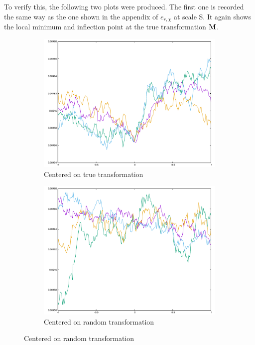 To verify this, the following two plots were produced. The first one is recorded the same way as the one shown in the appendix of $e_{r,\chi}$ at scale S. It again shows the local minimum and inflection point at the true transformation $\mathbf{M}$.

\begin{figure}[H]
\begin{subfigure}{.49\textwidth}
	\includegraphics[width=\linewidth]{fig/ajherr/t3rr/c1.pdf}
	\caption{Centered on true transformation}
\end{subfigure}%
\begin{subfigure}{.49\textwidth}
	\includegraphics[width=\linewidth]{fig/ajherr/t3rr/c2.pdf}
	\caption{Centered on random transformation}
\end{subfigure}
\end{figure}

